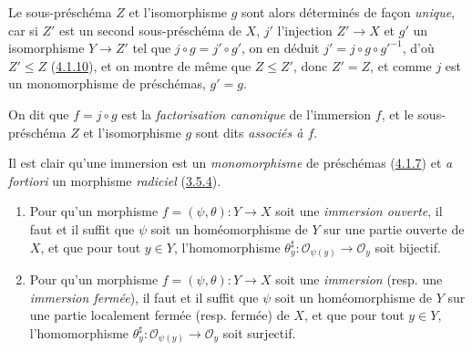 Le sous-préschéma $Z$ et l'isomorphisme $g$ sont alors déterminés de façon
\emph{unique}, car si $Z'$ est un second sous-préschéma de $X$, $j'$ l'injection
$Z'\to X$ et $g'$ un isomorphisme $Y\to Z'$ tel que
$j\circ g=j'\circ g'$, on en déduit $j'=j\circ g\circ {g'}^{-1}$, d'où
$Z'\leq Z$ (\hyperref[I.4.1.10-fr]{4.1.10}), et on montre de même que
$Z\leq Z'$, donc $Z'=Z$, et comme $j$ est un monomorphisme de préschémas,
$g'=g$.

On dit que $f=j\circ g$ est la \emph{factorisation canonique} de l'immersion
$f$, et le sous-préschéma $Z$ et l'isomorphisme $g$ sont dits
\emph{associés à $f$}.

Il est clair qu'une immersion est un \emph{monomorphisme} de préschémas
(\hyperref[I.4.1.7-fr]{4.1.7}) et \emph{a fortiori} un morphisme
\emph{radiciel} (\hyperref[I.3.5.4-fr]{3.5.4}).

\begin{proposition}[4.2.2]
\label{I.4.2.2-fr}
\begin{enumerate}
  \item[a)] Pour qu'un morphisme $f=(\psi,\theta):Y\to X$ soit une
  \emph{immersion ouverte}, il faut et il suffit que $\psi$ soit un
  homéomorphisme de $Y$ sur une partie ouverte de $X$, et que pour tout
  $y\in Y$, l'homomorphisme
  $\theta_y^\sharp:\mathscr{O}_{\psi(y)}\to\mathscr{O}_y$ soit bijectif.
  \item[b)] Pour qu'un morphisme $f=(\psi,\theta):Y\to X$ soit une
  \emph{immersion} (resp. une \emph{immersion fermée}), il faut et il suffit
  que $\psi$ soit un homéomorphisme de $Y$ sur une partie localement fermée
  (resp. fermée) de $X$, et que pour tout $y\in Y$, l'homomorphisme
  $\theta_y^\sharp:\mathscr{O}_{\psi(y)}\to\mathscr{O}_y$ soit surjectif.
\end{enumerate}
\end{proposition}

